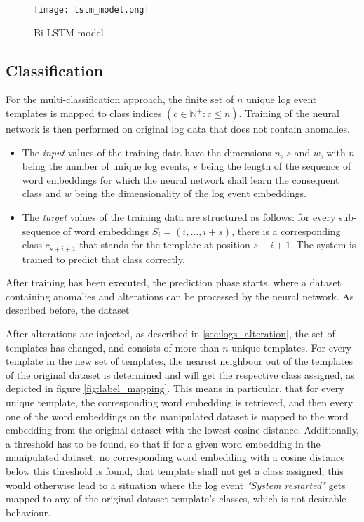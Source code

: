 \begin{figure}[H]
	\centering	
	\texttt{[image: lstm\_model.png]}
	\caption{Bi-LSTM model}
	\label{fig:lstm_model}
\end{figure}

\subsection{Classification \label{sec:classification}}
For the multi-classification approach, the finite set of $n$ unique log event templates is mapped to class indices $(c \in \mathbb{N}^{+}: c \leq n)$. Training of the neural network is then performed on original log data that does not contain anomalies.
\begin{itemize}
\setlength\itemsep{-0.5em}
	\item The \textit{input} values of the training data have the dimensions $n$, $s$ and $w$, with $n$ being the number of unique log events, $s$ being the length of the sequence of word embeddings for which the neural network shall learn the consequent class and $w$ being the dimensionality of the log event embeddings.
	\item The \textit{target} values of the training data are structured as follows: for every sub-sequence of word embeddings $S_i = (i, ..., i+s)$, there is a corresponding class $c_{s+i+1}$ that stands for the template at position $s+i+1$. The system is trained to predict that class correctly.
\end{itemize}

After training has been executed, the prediction phase starts, where a dataset containing anomalies and alterations can be processed by the neural network. As described before, the dataset 

After alterations are injected, as described in \ref{sec:logs_alteration}, the set of templates has changed, and consists of more than $n$ unique templates. For every template in the new set of templates, the nearest neighbour out of the templates of the original dataset is determined and will get the respective class assigned, as depicted in figure \ref{fig:label_mapping}. This means in particular, that for every unique template, the corresponding word embedding is retrieved, and then every one of the word embeddings on the manipulated dataset is mapped to the word embedding from the original dataset with the lowest cosine distance. Additionally, a threshold has to be found, so that if for a given word embedding in the manipulated dataset, no corresponding word embedding with a cosine distance below this threshold is found, that template shall not get a class assigned, this would otherwise lead to a situation where the log event \textit{"System restarted"} gets mapped to any of the original dataset template's classes, which is not desirable behaviour.


